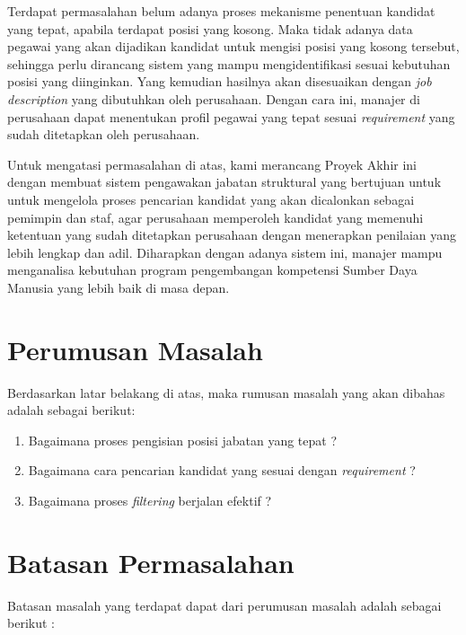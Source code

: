Terdapat permasalahan belum adanya proses mekanisme penentuan kandidat yang tepat, apabila terdapat posisi yang kosong. Maka tidak adanya data pegawai yang akan dijadikan kandidat untuk mengisi posisi yang kosong tersebut, sehingga perlu dirancang sistem yang mampu mengidentifikasi sesuai kebutuhan posisi yang diinginkan. Yang kemudian hasilnya akan disesuaikan dengan \textit{job description} yang dibutuhkan oleh perusahaan. Dengan cara ini, manajer di perusahaan dapat menentukan profil pegawai yang tepat sesuai \textit{requirement} yang sudah ditetapkan oleh perusahaan.

Untuk mengatasi permasalahan di atas, kami merancang Proyek Akhir ini dengan membuat sistem pengawakan jabatan struktural yang bertujuan untuk untuk mengelola proses pencarian kandidat yang akan dicalonkan sebagai pemimpin dan staf, agar perusahaan memperoleh kandidat yang memenuhi ketentuan yang sudah ditetapkan perusahaan dengan menerapkan penilaian yang lebih lengkap dan adil. Diharapkan dengan adanya sistem ini, manajer mampu menganalisa kebutuhan program pengembangan kompetensi Sumber Daya Manusia yang lebih baik di masa depan.


\section{Perumusan Masalah}
Berdasarkan latar belakang di atas, maka rumusan masalah yang akan dibahas adalah sebagai berikut:
\begin{enumerate}
\item Bagaimana proses pengisian posisi jabatan yang tepat ?
\item Bagaimana cara pencarian kandidat yang sesuai dengan \textit{requirement} ?
\item Bagaimana proses \textit{filtering} berjalan efektif ?
\end{enumerate}

\section{Batasan Permasalahan}
Batasan masalah yang terdapat dapat dari perumusan masalah adalah sebagai berikut :

